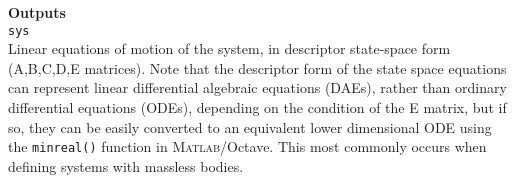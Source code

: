 \noindent \textbf{Outputs}\\
\texttt{sys}\\
Linear equations of motion of the system, in descriptor state-space form (A,B,C,D,E matrices).  Note that the descriptor form of the state space equations can represent linear differential algebraic equations (DAEs), rather than ordinary differential equations (ODEs), depending on the condition of the E matrix, but if so, they can be easily converted to an equivalent lower dimensional ODE using the \texttt{minreal()} function in M{\scshape atlab}\textsuperscript{\textregistered}/Octave.  This most commonly occurs when defining systems with massless bodies.
